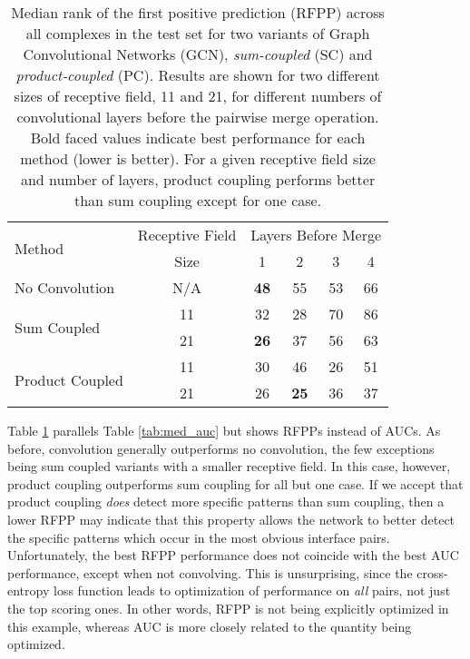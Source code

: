 \begin{table}
	\begin{center}
		\begin{tabular}{lccccc}
			\toprule
			\multirow{2}{*}{Method} &
			Receptive Field & \multicolumn{4}{c}{Layers Before Merge} \\
			& Size & 1 & {2} & {3} & {4} \\
			\midrule
			No Convolution & N/A & \textbf{48} & 55 & 53 & 66 \\\cline{1-6}
			\multirow{2}{*}{Sum Coupled} & 11 & 32 & 28 & 70 & 86 \\
			& 21 & \textbf{26} & 37 & 56 & 63 \\\cline{1-6}
			\multirow{2}{*}{Product Coupled} & 11 & 30 & 46 & 26 & 51 \\
			& 21 & 26 & \textbf{25} & 36 & 37 \\
			\bottomrule
		\end{tabular}
		\caption{Median rank of the first positive prediction (RFPP) across all complexes in the test set for two variants of Graph Convolutional Networks (GCN), \textit{sum-coupled} (SC) and \textit{product-coupled} (PC). Results are shown for two different sizes of receptive field, 11 and 21, for different numbers of convolutional layers before the pairwise merge operation. Bold faced values indicate best performance for each method (lower is better). For a given receptive field size and number of layers, product coupling performs better than sum coupling except for one case.}
		\label{tab:med_rfpp}
	\end{center}
\end{table}

Table \ref{tab:med_rfpp} parallels Table \ref{tab:med_auc} but shows RFPPs instead of AUCs.
As before, convolution generally outperforms no convolution, the few exceptions being sum coupled variants with a smaller receptive field.
In this case, however, product coupling outperforms sum coupling for all but one case.
If we accept that product coupling \emph{does} detect more specific patterns than sum coupling, then a lower RFPP may indicate that this property allows the network to better detect the specific patterns which occur in the most  obvious interface pairs.
Unfortunately, the best RFPP performance does not coincide with the best AUC performance, except when not convolving.
This is unsurprising, since the cross-entropy loss function leads to optimization of performance on \emph{all} pairs, not just the top scoring ones.
In other words, RFPP is not being explicitly optimized in this example, whereas AUC is more closely related to the quantity being optimized.

